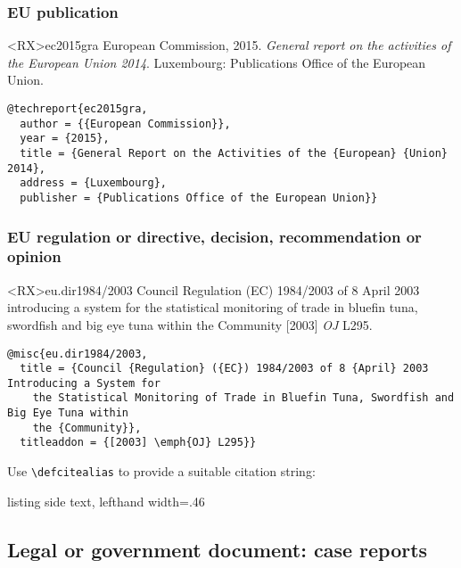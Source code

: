 \documentclass[10pt,a4paper]{article}
\newenvironment{hacks}{%
  \begin{list}{\makebox[2em][c]{\faWrench}}{%
    \setlength{\leftmargin}{2em}
    \setlength{\labelwidth}{2em}
    \setlength{\labelsep}{0pt}}
}{\end{list}}
\begin{document}
\subsubsection*{EU publication}

\begin{bibexbox}<RX>{ec2015gra}
  European Commission, 2015. \emph{General report on the activities of the European Union 2014}. Luxembourg: Publications Office of the European Union.
  \tcblower
\begin{Verbatim}
@techreport{ec2015gra,
  author = {{European Commission}},
  year = {2015},
  title = {General Report on the Activities of the {European} {Union} 2014},
  address = {Luxembourg},
  publisher = {Publications Office of the European Union}}
\end{Verbatim}
\end{bibexbox}


\subsubsection*{EU regulation or directive, decision, recommendation or opinion}

\begin{bibexbox}<RX>{eu.dir1984/2003}
  Council Regulation (EC) 1984/2003 of 8 April 2003 introducing a system for the statistical monitoring of trade in bluefin tuna, swordfish and big eye tuna within the Community [2003] \emph{OJ} L295.
  \tcblower
\begin{Verbatim}
@misc{eu.dir1984/2003,
  title = {Council {Regulation} ({EC}) 1984/2003 of 8 {April} 2003 Introducing a System for
    the Statistical Monitoring of Trade in Bluefin Tuna, Swordfish and Big Eye Tuna within
    the {Community}},
  titleaddon = {[2003] \emph{OJ} L295}}
\end{Verbatim}
\end{bibexbox}

\begin{hacks}\item
Use \lstinline[style=dtxlatex]|\defcitealias| to provide a suitable citation string:
\begin{tcblisting}{listing side text, lefthand width=.46\linewidth}
\end{tcblisting}
\end{hacks}

\subsection{Legal or government document: case reports}
\end{document}
